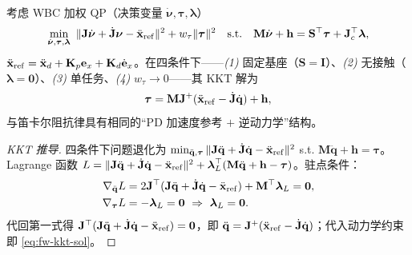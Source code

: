 \begin{theorem}
\label{thm:fw-kkt}
考虑 WBC 加权 QP（决策变量 $\dot{\boldsymbol{\nu}},\boldsymbol{\tau},\boldsymbol{\lambda}$）
\begin{equation}
  \min_{\dot{\boldsymbol{\nu}},\boldsymbol{\tau},\boldsymbol{\lambda}}\ \|\mathbf{J}\dot{\boldsymbol{\nu}}+\dot{\mathbf{J}}\boldsymbol{\nu}-\ddot{\mathbf{x}}_{\rm ref}\|^2+w_\tau\|\boldsymbol{\tau}\|^2
  \quad \text{s.t.}\quad \mathbf{M}\dot{\boldsymbol{\nu}}+\mathbf{h}=\mathbf{S}^\top\boldsymbol{\tau}+\mathbf{J}_c^\top\boldsymbol{\lambda},
  \label{eq:fw-wbcqp}
\end{equation}
$\ddot{\mathbf{x}}_{\rm ref}=\ddot{\mathbf{x}}_d+\mathbf{K}_p\mathbf{e}_x+\mathbf{K}_d\dot{\mathbf{e}}_x$。在四条件下——\emph{(1)} 固定基座（$\mathbf{S}=\mathbf{I}$）、\emph{(2)} 无接触（$\boldsymbol{\lambda}=\mathbf{0}$）、\emph{(3)} 单任务、\emph{(4)} $w_\tau\to0$——其 KKT 解为
\begin{equation}
  \boldsymbol{\tau}=\mathbf{M}\mathbf{J}^+(\ddot{\mathbf{x}}_{\rm ref}-\dot{\mathbf{J}}\dot{\mathbf{q}})+\mathbf{h},
  \label{eq:fw-kkt-sol}
\end{equation}
与笛卡尔阻抗律具有相同的“PD 加速度参考 $+$ 逆动力学”结构。
\end{theorem}

\begin{proof}[KKT 推导]
四条件下问题退化为 $\min_{\ddot{\mathbf{q}},\boldsymbol{\tau}}\|\mathbf{J}\ddot{\mathbf{q}}+\dot{\mathbf{J}}\dot{\mathbf{q}}-\ddot{\mathbf{x}}_{\rm ref}\|^2$ s.t. $\mathbf{M}\ddot{\mathbf{q}}+\mathbf{h}=\boldsymbol{\tau}$。Lagrange 函数 $L=\|\mathbf{J}\ddot{\mathbf{q}}+\dot{\mathbf{J}}\dot{\mathbf{q}}-\ddot{\mathbf{x}}_{\rm ref}\|^2+\boldsymbol{\lambda}_L^\top(\mathbf{M}\ddot{\mathbf{q}}+\mathbf{h}-\boldsymbol{\tau})$。驻点条件：
\begin{align}
  \nabla_{\ddot{\mathbf{q}}}L&=2\mathbf{J}^\top(\mathbf{J}\ddot{\mathbf{q}}+\dot{\mathbf{J}}\dot{\mathbf{q}}-\ddot{\mathbf{x}}_{\rm ref})+\mathbf{M}^\top\boldsymbol{\lambda}_L=\mathbf{0},\\
  \nabla_{\boldsymbol{\tau}}L&=-\boldsymbol{\lambda}_L=\mathbf{0}\ \Rightarrow\ \boldsymbol{\lambda}_L=\mathbf{0}.
\end{align}
代回第一式得 $\mathbf{J}^\top(\mathbf{J}\ddot{\mathbf{q}}+\dot{\mathbf{J}}\dot{\mathbf{q}}-\ddot{\mathbf{x}}_{\rm ref})=\mathbf{0}$，即 $\ddot{\mathbf{q}}=\mathbf{J}^+(\ddot{\mathbf{x}}_{\rm ref}-\dot{\mathbf{J}}\dot{\mathbf{q}})$；代入动力学约束即 \cref{eq:fw-kkt-sol}。
\end{proof}

